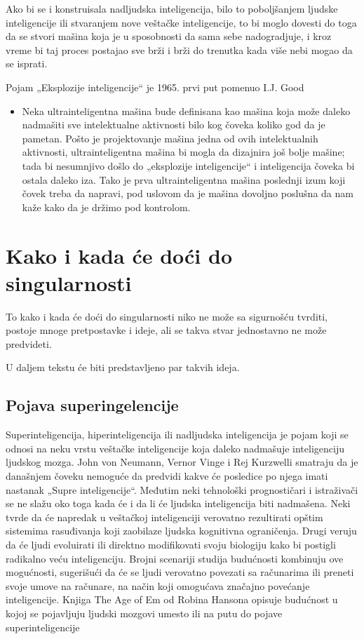 \documentclass[a4paper]{article}
\begin{document}
Ako bi se i konstruisala nadljudska inteligencija, bilo to poboljšanjem ljudske inteligencije ili stvaranjem nove veštačke inteligencije, to bi moglo dovesti do toga da se stvori mašina koja je u sposobnosti da sama sebe nadogradjuje, i kroz vreme bi taj proces postajao sve brži i brži do trenutka kada više nebi mogao da se isprati.

Pojam „Eksplozije inteligencije“ je 1965. prvi put pomenuo I.J. Good\cite{ref 3}

\begin{itemize}
\item Neka ultrainteligentna mašina bude definisana kao mašina koja može daleko nadmašiti sve intelektualne aktivnosti bilo kog čoveka koliko god da je pametan. Pošto je projektovanje mašina jedna od ovih intelektualnih aktivnosti, ultrainteligentna mašina bi mogla da dizajnira još bolje mašine; tada bi nesumnjivo došlo do „eksplozije inteligencije“ i inteligencija čoveka bi ostala daleko iza. Tako je prva ultrainteligentna mašina poslednji izum koji čovek treba da napravi, pod uslovom da je mašina dovoljno poslušna da nam kaže kako da je držimo pod kontrolom.
\end{itemize} 
\section{Kako i kada će doći do singularnosti}	
\label{sec:kakoikada}
To kako i kada će doći do singularnosti niko ne može sa sigurnošću tvrditi, postoje mnoge pretpostavke i ideje, ali se takva stvar jednostavno ne može predvideti.

U daljem tekstu će biti predstavljeno par takvih ideja.
\subsection{Pojava superingelencije}

Superinteligencija, hiperinteligencija ili nadljudska inteligencija je pojam koji se odnosi na neku vrstu veštačke inteligencije koja daleko nadmašuje inteligenciju ljudskog mozga.  John von Neumann, Vernor Vinge i Rej Kurzwelli smatraju da je današnjem čoveku nemoguće da predvidi kakve će posledice po njega imati nastanak „Supre inteligencije“.\cite{ref 4}\cite{ref 5}
Međutim neki tehnološki prognostičari i istraživači se ne slažu oko toga kada će i da li će ljudska inteligencija biti nadmašena.  Neki tvrde da će napredak u veštačkoj inteligenciji verovatno rezultirati opštim sistemima rasuđivanja koji zaobilaze ljudska kognitivna ograničenja. Drugi veruju da će ljudi evoluirati ili direktno modifikovati svoju biologiju kako bi postigli radikalno veću inteligenciju.\cite{ref 6}\cite{ref 7}
Brojni scenariji studija budućnosti kombinuju ove mogućnosti, sugerišući da će se ljudi verovatno povezati sa računarima ili preneti svoje umove na računare, na način koji omogućava značajno povećanje inteligencije. Knjiga The Age of Em od Robina Hansona opisuje budućnost u kojoj se pojavljuju ljudski mozgovi umesto ili na putu do pojave superinteligencije\cite{ref 8}
\end{document}
